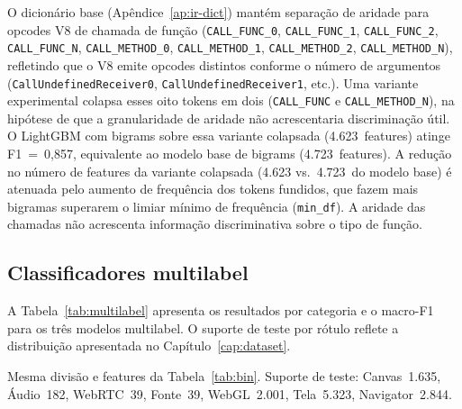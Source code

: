 O dicionário base (Apêndice~\ref{ap:ir-dict}) mantém separação de aridade para
opcodes V8 de chamada de função (\texttt{CALL\_FUNC\_0}, \texttt{CALL\_FUNC\_1},
\texttt{CALL\_FUNC\_2}, \texttt{CALL\_FUNC\_N}, \texttt{CALL\_METHOD\_0},
\texttt{CALL\_METHOD\_1}, \texttt{CALL\_METHOD\_2}, \texttt{CALL\_METHOD\_N}),
refletindo que o V8 emite opcodes distintos conforme o número de argumentos
(\texttt{CallUndefinedReceiver0}, \texttt{CallUndefinedReceiver1}, etc.). Uma
variante experimental colapsa esses oito tokens em dois (\texttt{CALL\_FUNC} e
\texttt{CALL\_METHOD\_N}), na hipótese de que a granularidade de aridade não
acrescentaria discriminação útil. O LightGBM com bigrams sobre essa variante
colapsada (4.623~features) atinge F1~=~0,857, equivalente ao modelo base de bigrams
(4.723~features). A redução no número de features da variante colapsada (4.623 vs.\ 4.723~do modelo base)
é atenuada pelo aumento de frequência dos tokens fundidos, que fazem mais bigramas
superarem o limiar mínimo de frequência (\texttt{min\_df}).
A aridade das chamadas não acrescenta informação discriminativa sobre o tipo de função.

\subsection{Classificadores multilabel}
\label{sec:multilabel}

A Tabela~\ref{tab:multilabel} apresenta os resultados por categoria e o macro-F1
para os três modelos multilabel. O suporte de teste por rótulo reflete a
distribuição apresentada no Capítulo~\ref{cap:dataset}.

\begin{table}[htb]
\centering
\caption{Classificadores multilabel: 7 categorias de fingerprinting}
\label{tab:multilabel}
{\footnotesize
Mesma divisão e features da Tabela~\ref{tab:bin}. Suporte de teste: Canvas~1.635,
Áudio~182, WebRTC~39, Fonte~39, WebGL~2.001, Tela~5.323, Navigator~2.844.
}

\bigskip
{}
\end{table}


